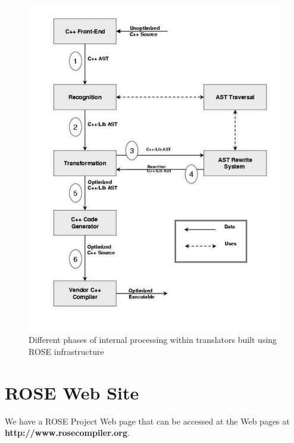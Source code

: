 \begin{figure}

\includegraphics[trim=6.0in 0in 0in 0in,scale=0.5]{rose-processing-phases}
\caption{Different phases of internal processing within translators built using ROSE infrastructure}
\label{introduction:phases}
\end{figure}



\section{ROSE Web Site}
    We have a ROSE Project Web page that can be accessed at the 
Web pages at
{\bf http://www.rosecompiler.org}.

